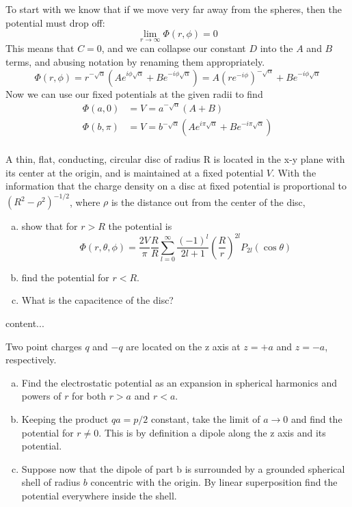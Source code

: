 \documentclass{article}
\begin{document}
\begin{solution}
To start with we know that if we move very far away from the spheres, then the potential must drop off: 
\[\lim_{r\to\infty} \Phi(r,\phi) = 0\]
This means that $C=0$, and we can collapse our constant $D$ into the $A$ and $B$ terms, and abusing notation by renaming them appropriately.
\[ \Phi(r,\phi) = r^{-\sqrt{\alpha}} \left( Ae^{i\phi\sqrt{\alpha}} + Be^{-i\phi\sqrt{\alpha}} \right) = A(re^{-i\phi})^{-\sqrt{\alpha}} + Be^{-i\phi\sqrt{\alpha}} \]
Now we can use our fixed potentials at the given radii to find
\begin{align*}
\Phi(a,0) &= V = a^{-\sqrt{\alpha}} \left( A + B \right)\\
\Phi(b,\pi) &= V =b^{-\sqrt{\alpha}} \left( Ae^{i\pi\sqrt{\alpha}} + Be^{-i\pi\sqrt{\alpha}} \right)\\
\end{align*}

\end{solution}

\setcounter{problem}{2}
\begin{problem}\label{problem3.3}
A thin, flat, conducting, circular disc of radius R is located in the x-y plane with its center at the origin, and is maintained at a fixed potential $V$. With the information that the charge density on a disc at fixed potential is proportional to $\left( R^{2} - \rho^{2} \right)^{-1/2} $, where $\rho$ is the distance out from the center of the disc,
\begin{enumerate}[(a)]
\item show that for $r > R$ the potential is
\[ \Phi(r,\theta,\phi) = \frac{2V}{\pi} \frac{R}{R} \sum_{l=0}^{\infty} \frac{(-1)^{l}}{2l + 1} \left( \frac{R}{r} \right)^{2l} P_{2l}(\cos \theta) \]
\item find the potential for $r < R$.
\item What is the capacitence of the disc?
\end{enumerate}
\end{problem}

\setcounter{solution}{2}
\begin{solution}
content...
\end{solution}

\setcounter{problem}{5}
\begin{problem}\label{problem3.6}
Two point charges $q$ and $-q$ are located on the z axis at $z = +a$ and $z = -a$, respectively.
\begin{enumerate}[(a)]
\item Find the electrostatic potential as an expansion in spherical harmonics and powers of $r$ for both $r > a$ and $r < a$.
\item Keeping the product $qa = p/2$ constant, take the limit of $a \to 0$ and find the potential for $r \ne 0$. This is by definition a dipole along the z axis and its potential.
\item Suppose now that the dipole of part b is surrounded by a grounded spherical shell of radius $b$ concentric with the origin. By linear superposition find the potential everywhere inside the shell.
\end{enumerate}
\end{problem}
\end{document}
